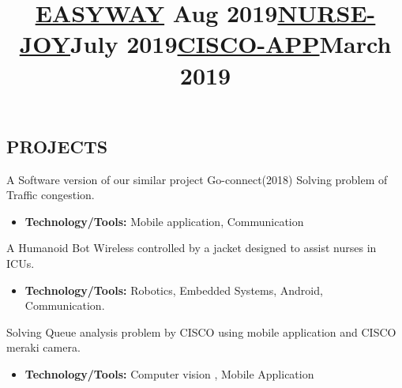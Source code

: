 \documentclass[margin]{res}
\begin{document}
\begin{resume}
\section{PROJECTS}

\employer{}
\location{}
\title{\textbf{\underline{EASYWAY} \hfill Aug 2019}}
\begin{position}
A Software version of our similar project Go-connect(2018) Solving problem of Traffic congestion.
\begin{itemize}
\item \textbf{Technology/Tools:} Mobile application, Communication
\end{itemize}
\end{position}

\employer{}
\location{}
\title{\textbf{\underline{NURSE-JOY}\hfill July 2019}}
\begin{position}
A Humanoid Bot Wireless controlled by a jacket designed to assist nurses in ICUs.
\begin{itemize}
\item \textbf{Technology/Tools:} Robotics, Embedded Systems, Android, Communication.
\end{itemize}
\end{position}

\employer{}
\location{}
\title{\textbf{\underline{CISCO-APP}\hfill March 2019}
 }
\begin{position}
Solving Queue analysis problem by CISCO using mobile application and         CISCO meraki camera.
\begin{itemize}
\item \textbf{Technology/Tools:} Computer vision , Mobile Application
\end{itemize}
\end{position}


\end{resume}
\end{document}
